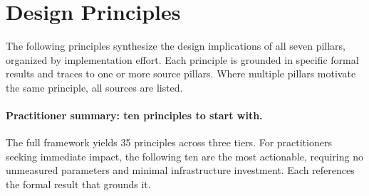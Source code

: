 \documentclass[11pt, a4paper]{googledeepmind}
\begin{document}
\section{Design Principles}
\label{sec:principles}

The following principles synthesize the design implications of all seven pillars, organized by implementation effort. Each principle is grounded in specific formal results and traces to one or more source pillars. Where multiple pillars motivate the same principle, all sources are listed.

\paragraph{Practitioner summary: ten principles to start with.}
The full framework yields 35 principles across three tiers. For practitioners seeking immediate impact, the following ten are the most actionable, requiring no unmeasured parameters and minimal infrastructure investment. Each references the formal result that grounds it.
\end{document}
